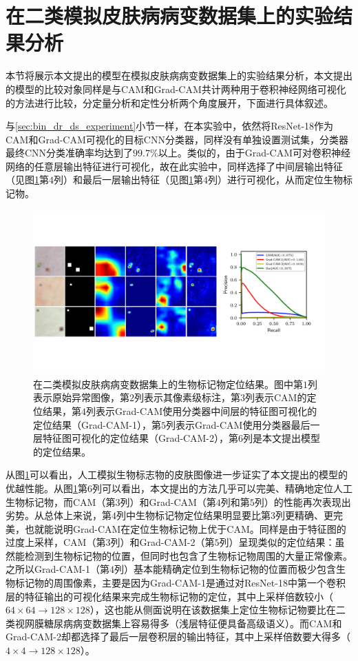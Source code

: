 \section{在二类模拟皮肤病病变数据集上的实验结果分析}\label{sec:bin_simulated_ds_experiment}
本节将展示本文提出的模型在模拟皮肤病病变数据集上的实验结果分析，本文提出的模型的比较对象同样是与CAM和Grad-CAM共计两种用于卷积神经网络可视化的方法进行比较，分定量分析和定性分析两个角度展开，下面进行具体叙述。

与\ref{sec:bin_dr_ds_experiment}小节一样，在本实验中，依然将ResNet-18作为CAM和Grad-CAM可视化的目标CNN分类器，同样没有单独设置测试集，分类器最终CNN分类准确率均达到了$99.7\%$以上。类似的，由于Grad-CAM可对卷积神经网络的任意层输出特征进行可视化，故在此实验中，同样选择了中间层输出特征（见图\ref{fig:simulated_skin}第$4$列）和最后一层输出特征（见图\ref{fig:simulated_skin}第$4$列）进行可视化，从而定位生物标记物。
\begin{figure}[h]
	\centering
	\includegraphics[width=1.0\textwidth]{figure/pr_curve_skin_image.pdf}
	\caption{在二类模拟皮肤病病变数据集上的生物标记物定位结果。图中第$1$列表示原始异常图像，第$2$列表示其像素级标注，第$3$列表示CAM的定位结果，第$4$列表示Grad-CAM使用分类器中间层的特征图可视化的定位结果（Grad-CAM-1），第$5$列表示Grad-CAM使用分类器最后一层特征图可视化的定位结果（Grad-CAM-2），第$6$列是本文提出模型的定位结果。} 
	\label{fig:simulated_skin}
\end{figure}

\noindent 从图\ref{fig:simulated_skin}可以看出，人工模拟生物标志物的皮肤图像进一步证实了本文提出的模型的优越性能。从图\ref{fig:simulated_skin}第$6$列可以看出，本文提出的方法几乎可以完美、精确地定位人工生物标记物，而CAM（第$3$列）和Grad-CAM（第$4$列和第$5$列）的性能再次表现出劣势。从总体上来说，第$4$列中生物标记物定位结果明显要比第$3$列更精确、更完美，也就能说明Grad-CAM在定位生物标记物上优于CAM。同样是由于特征图的过度上采样，CAM（第$3$列）和Grad-CAM-2（第$5$列）呈现类似的定位结果：虽然能检测到生物标记物的位置，但同时也包含了生物标记物周围的大量正常像素。之所以Grad-CAM-1（第$4$列）基本能精确定位到生物标记物的位置而极少包含生物标记物的周围像素，主要是因为Grad-CAM-1是通过对ResNet-18中第一个卷积层的特征输出的可视化结果来完成生物标记物的定位，其中上采样倍数较小（$64\times 64\rightarrow 128\times 128$），这也能从侧面说明在该数据集上定位生物标记物要比在二类视网膜糖尿病病变数据集上容易得多（浅层特征便具备高级语义）。而CAM和Grad-CAM-2却都选择了最后一层卷积层的输出特征，其中上采样倍数要大得多（$4\times4\rightarrow 128\times 128$）。

